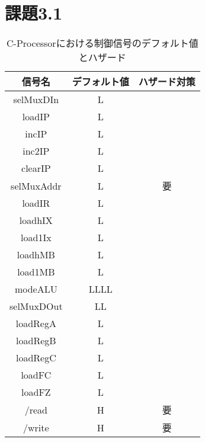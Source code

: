 \documentclass[dvipdfmx]{jarticle}
\begin{document}
\section{課題3.1}
\begin{table}[h]
    \centering
    \begin{tabular}{|c|c|c|}
    \hline
    信号名 & デフォルト値 & ハザード対策\\\hline
    selMuxDIn&L&\\
    loadIP&L&\\
    incIP&L&\\
    inc2IP&L&\\
    clearIP&L&\\
    selMuxAddr&L&要\\
    loadIR&L&\\
    loadhIX&L&\\
    load1Ix&L&\\
    loadhMB&L&\\
    load1MB&L&\\
    modeALU&LLLL&\\
    selMuxDOut&LL&\\
    loadRegA&L&\\
    loadRegB&L&\\
    loadRegC&L&\\
    loadFC&L&\\
    loadFZ&L&\\
    /read&H&要\\
    /write&H &要\\
    \hline
    \end{tabular}
    \caption{C-Processorにおける制御信号のデフォルト値とハザード}
\end{table}
\clearpage
\end{document}
